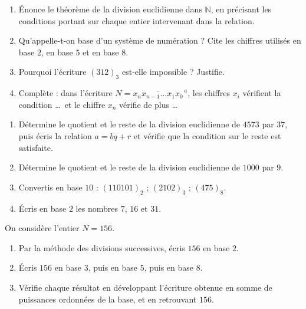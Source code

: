 \documentclass[11pt]{article}
\newcommand{\cle}[1]{{\popxbold\color{popdark}#1}}
\newcounter{popsec}
\newcounter{popsub}
\newcommand{\courssub}[1]{%
  \stepcounter{popsub}%
  \par\vspace{9pt}\noindent{\popxbold\fontsize{11.5}{13}\selectfont\color{popink}{\color{poporange}\thepopsec.\thepopsub}\hspace{6pt}#1}\par\nopagebreak\vspace{4pt}
}
\begin{document}
\begin{exercice}
\begin{enumerate}
\item Énonce le théorème de la division euclidienne dans $\mathbb{N}$, en précisant les conditions portant sur chaque entier intervenant dans la relation.
\item Qu'appelle-t-on \cle{base} d'un système de numération ? Cite les chiffres utilisés en base $2$, en base $5$ et en base $8$.
\item Pourquoi l'écriture $(312)_3$ est-elle impossible ? Justifie.
\item Complète : dans l'écriture $N = \overline{x_n x_{n-1} \ldots x_1 x_0}^{\,a}$, les chiffres $x_i$ vérifient la condition \ldots\ et le chiffre $x_n$ vérifie de plus \ldots
\end{enumerate}
\end{exercice}

\begin{exercice}
\begin{enumerate}
\item Détermine le quotient et le reste de la division euclidienne de $4573$ par $37$, puis écris la relation $a = bq + r$ et vérifie que la condition sur le reste est satisfaite.
\item Détermine le quotient et le reste de la division euclidienne de $1000$ par $9$.
\item Convertis en base $10$ : $(110101)_2$ ; $(2102)_3$ ; $(475)_8$.
\item Écris en base $2$ les nombres $7$, $16$ et $31$.
\end{enumerate}
\end{exercice}

\courssub{Je m'entraîne}

\begin{exercice}
On considère l'entier $N = 156$.
\begin{enumerate}
\item Par la méthode des divisions successives, écris $156$ en base $2$.
\item Écris $156$ en base $3$, puis en base $5$, puis en base $8$.
\item Vérifie chaque résultat en développant l'écriture obtenue en somme de puissances ordonnées de la base, et en retrouvant $156$.
\end{enumerate}
\end{exercice}
\end{document}
